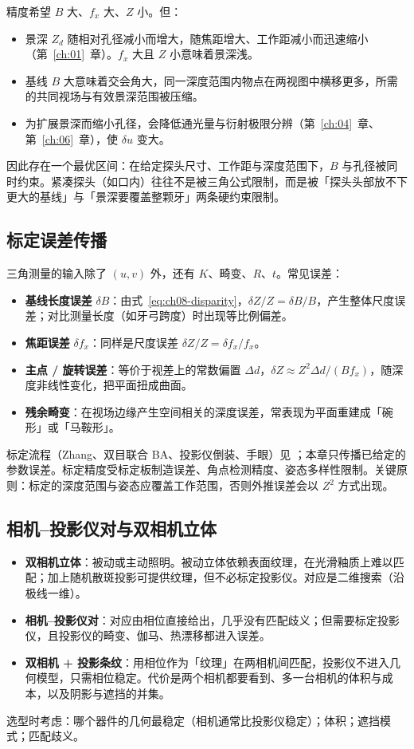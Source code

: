 精度希望 $B$ 大、$f_x$ 大、$Z$ 小。但：
\begin{itemize}
  \item 景深 $Z_d$ 随相对孔径减小而增大，随焦距增大、工作距减小而迅速缩小（第~\ref{ch:01}~章）。$f_x$ 大且 $Z$ 小意味着景深浅。
  \item 基线 $B$ 大意味着交会角大，同一深度范围内物点在两视图中横移更多，所需的共同视场与有效景深范围被压缩。
  \item 为扩展景深而缩小孔径，会降低通光量与衍射极限分辨（第~\ref{ch:04}~章、第~\ref{ch:06}~章），使 $\delta u$ 变大。
\end{itemize}
因此存在一个最优区间：在给定探头尺寸、工作距与深度范围下，$B$ 与孔径被同时约束。紧凑探头（如口内）往往不是被三角公式限制，而是被「探头头部放不下更大的基线」与「景深要覆盖整颗牙」两条硬约束限制。

\subsection{标定误差传播}

三角测量的输入除了 $(u,v)$ 外，还有 $K$、畸变、$R$、$t$。常见误差：
\begin{itemize}
  \item \textbf{基线长度误差} $\delta B$：由式~\eqref{eq:ch08-disparity}，$\delta Z/Z=\delta B/B$，产生整体尺度误差；对比测量长度（如牙弓跨度）时出现等比例偏差。
  \item \textbf{焦距误差} $\delta f_x$：同样是尺度误差 $\delta Z/Z=\delta f_x/f_x$。
  \item \textbf{主点 / 旋转误差}：等价于视差上的常数偏置 $\Delta d$，$\delta Z\approx Z^2\Delta d/(Bf_x)$，随深度非线性变化，把平面扭成曲面。
  \item \textbf{残余畸变}：在视场边缘产生空间相关的深度误差，常表现为平面重建成「碗形」或「马鞍形」。
\end{itemize}
标定流程（Zhang、双目联合 BA、投影仪倒装、手眼）见 ；本章只传播已给定的参数误差。标定精度受标定板制造误差、角点检测精度、姿态多样性限制。关键原则：标定的深度范围与姿态应覆盖工作范围，否则外推误差会以 $Z^2$ 方式出现。

\subsection{相机–投影仪对与双相机立体}

\begin{itemize}
  \item \textbf{双相机立体}：被动或主动照明。被动立体依赖表面纹理，在光滑釉质上难以匹配；加上随机散斑投影可提供纹理，但不必标定投影仪。对应是二维搜索（沿极线一维）。
  \item \textbf{相机–投影仪对}：对应由相位直接给出，几乎没有匹配歧义；但需要标定投影仪，且投影仪的畸变、伽马、热漂移都进入误差。
  \item \textbf{双相机 + 投影条纹}：用相位作为「纹理」在两相机间匹配，投影仪不进入几何模型，只需相位稳定。代价是两个相机都要看到、多一台相机的体积与成本，以及阴影与遮挡的并集。
\end{itemize}
选型时考虑：哪个器件的几何最稳定（相机通常比投影仪稳定）；体积；遮挡模式；匹配歧义。

